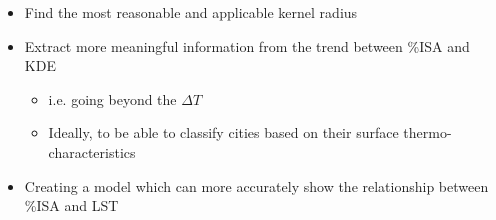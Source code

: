 \documentclass{article}
\begin{document}
\begin{itemize}
    \item Find the most reasonable and applicable kernel radius
    \item Extract more meaningful information from the trend between \%ISA and KDE
    \begin{itemize}
        \item i.e. going beyond the $\Delta T$
        \item Ideally, to be able to classify cities based on their surface thermo-characteristics
    \end{itemize}
    \item Creating a model which can more accurately show the relationship between \%ISA and LST
    
\end{itemize}
\end{document}
